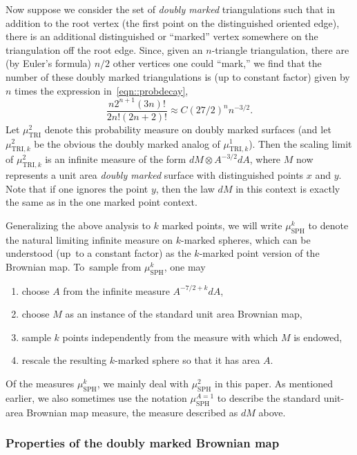 \documentclass[JEP,XML,SOM,Unicode]{cedram}
\theoremstyle{plain}
\numberwithin{theorem}{section}
\theoremstyle{definition}
\newcommand{\mustwo}{\mu_{\mathrm{SPH}}^2}
\newcommand{\musk}{\mu_{\mathrm{SPH}}^k}
\newcommand{\musa}{{\mu_{\mathrm{SPH}}^{A=1}}}
\begin{document}
Now suppose we consider the set of \emph{doubly marked} triangulations such that in addition to the root vertex (the first point on the distinguished oriented edge), there is an additional distinguished or ``marked'' vertex somewhere on the triangulation off the root edge. Since, given an $n$-triangle triangulation, there are (by Euler's formula) $n/2$ other vertices one could ``mark,'' we find that the number of these doubly marked triangulations is (up to constant factor) given by $n$ times the expression in~\eqref{eqn::probdecay}, \ie
\begin{equation}
\label{eqn::probdecay2}
\frac{n 2^{n+1} (3n)!}{2n! (2n+2)!} \approx C (27/2)^n n^{-3/2}.
\end{equation}
Let $\mu^2_{\mathrm{TRI}}$ denote this probability measure on doubly marked surfaces (and let $\mu^2_{\mathrm{TRI},k}$ be the obvious the doubly marked analog of $\mu^1_{\mathrm{TRI},k}$). Then the scaling limit of $\mu^2_{\mathrm{TRI},k}$ is an infinite measure of the form $dM \otimes A^{-3/2} dA$, where $M$ now represents a unit area \emph{doubly marked} surface with distinguished points $x$ and $y$. Note that if one ignores the point $y$, then the law $dM$ in this context is exactly the same as in the one marked point context.

Generalizing the above analysis to $k$ marked points, we will write $\musk$ to denote the natural limiting infinite measure on $k$-marked spheres, which can be understood (up~to a constant factor) as the $k$-marked point version of the Brownian map. To~sample from $\musk$, one may
\begin{enumerate}
\item choose $A$ from the infinite measure $A^{-7/2 + k}dA$,
\item choose $M$ as an instance of the standard unit area Brownian map,
\item sample $k$ points independently from the measure with which $M$ is endowed,
\item rescale the resulting $k$-marked sphere so that it has area $A$.
\end{enumerate}
Of the measures $\musk$, we mainly deal with $\mustwo$ in this paper. As mentioned earlier, we also sometimes use the notation $\musa$ to describe the standard unit-area Brownian map measure, \ie the measure described as $dM$ above.

\subsubsection{Properties of the doubly marked Brownian map}
\label{subsubsec::doublymarkedproperties}
\end{document}
